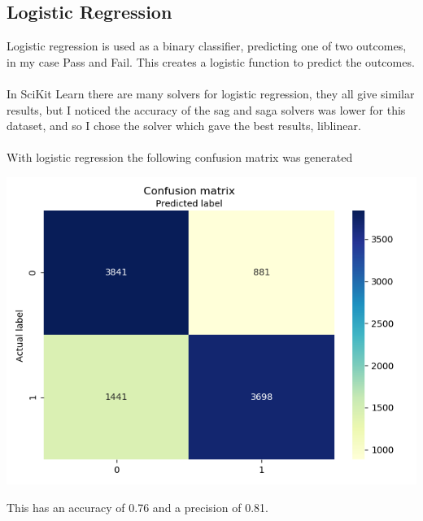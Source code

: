 \documentclass{article}[18pt]
\begin{document}
\subsection{Logistic Regression}
Logistic regression is used as a binary classifier, predicting one of two outcomes, in my case Pass and Fail. This creates a logistic function to predict the outcomes.\\
\\
In SciKit Learn there are many solvers for logistic regression, they all give similar results, but I noticed the accuracy of the sag and saga solvers was lower for this dataset, and so I chose the solver which gave the best results, liblinear.\\
\\
With logistic regression the following confusion matrix was generated
\begin{center}
	\includegraphics[scale=0.7]{Logistic_Regression}
\end{center}
This has an accuracy of 0.76 and a precision of 0.81.
\end{document}
